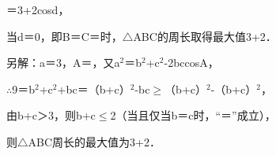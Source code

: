 \begin{question}
\begin{solution}
＝3+2\allowbreak{}cosd，\par
当d＝0，即B＝C＝\allowbreak{}时，$\triangle$ABC的周长取得最大值3+2\allowbreak{}．\par
另解：a＝3，A＝\allowbreak{}，又a$^{2}$＝b$^{2}$+c$^{2}$-2bccosA，\par
$\therefore$9＝b$^{2}$+c$^{2}$+bc＝（b+c）$^{2}$-bc$\geq$（b+c）$^{2}$-\allowbreak{}（b+c）$^{2}$，\par
由b+c＞3，则b+c$\leq$2\allowbreak{}（当且仅当b＝c时，“＝”成立），\par
则$\triangle$ABC周长的最大值为3+2\allowbreak{}．\par
\end{solution}
\end{question}


